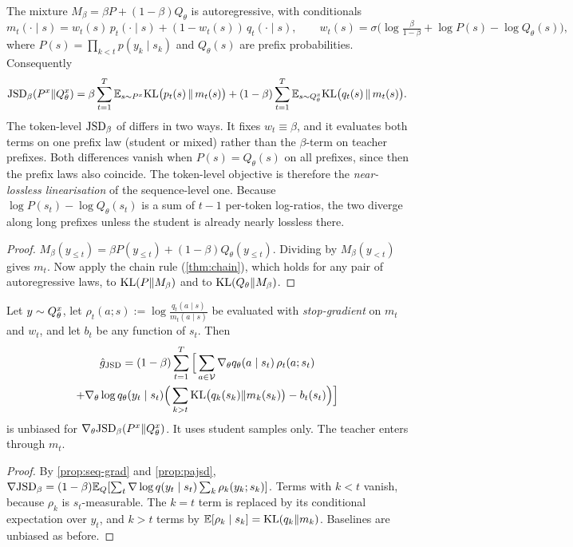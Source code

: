 \begin{proposition}\label{prop:pajsd}
\Pv The mixture $M_\beta=\beta P+(1-\beta)Q_\theta$ is autoregressive, with conditionals
\[
m_t(\cdot\mid s)=w_t(s)\,p_t(\cdot\mid s)+(1-w_t(s))\,q_t(\cdot\mid s),\qquad
w_t(s)=\sigma\Big(\log\tfrac\beta{1-\beta}+\log P(s)-\log Q_\theta(s)\Big),
\]
where $P(s)=\prod_{k<t}p(y_k\mid s_k)$ and $Q_\theta(s)$ are prefix probabilities. Consequently
\[
\mathrm{JSD}_\beta(P^{x}\|Q^{x}_{\theta})=\beta\sum_{t=1}^T\mathbb{E}_{s\sim P^{x}}\mathrm{KL}\big(p_t(s)\,\|\,m_t(s)\big)+(1-\beta)\sum_{t=1}^T\mathbb{E}_{s\sim Q^{x}_{\theta}}\mathrm{KL}\big(q_t(s)\,\|\,m_t(s)\big).
\]
The token-level $\mathrm{JSD}_\beta$ of \citet{agarwal2024gkd} differs in two ways. It fixes $w_t\equiv\beta$, and it
evaluates both terms on one prefix law (student or mixed) rather than the $\beta$-term on teacher
prefixes. Both differences vanish when $P(s)=Q_\theta(s)$ on all prefixes, since then the prefix laws also
coincide. The token-level objective is therefore the \emph{near-lossless linearisation} of the sequence-level
one. Because $\log P(s_t)-\log Q_\theta(s_t)$ is a sum of $t-1$ per-token log-ratios, the two diverge along long
prefixes unless the student is already nearly lossless there.
\end{proposition}
\begin{proof}
$M_\beta(y_{\le t})=\beta P(y_{\le t})+(1-\beta)Q_\theta(y_{\le t})$. Dividing by $M_\beta(y_{<t})$ gives $m_t$. Now
apply the chain rule (\cref{thm:chain}), which holds for any pair of autoregressive laws, to $\mathrm{KL}(P\|M_\beta)$
and to $\mathrm{KL}(Q_\theta\|M_\beta)$.
\end{proof}

\begin{proposition}\label{prop:jsd-est}
\Pv Let $y\sim Q^{x}_{\theta}$, let $\rho_t(a;s):=\log\frac{q_t(a\mid s)}{m_t(a\mid s)}$ be evaluated with \emph{stop-gradient}
on $m_t$ and $w_t$, and let $b_t$ be any function of $s_t$. Then
\begin{multline*}
\hat g_{\mathrm{JSD}}=(1-\beta)\sum_{t=1}^T\Big[\sum_{a\in\mathcal{V}}\nabla_\theta q_\theta(a\mid s_t)\,\rho_t(a;s_t)\\
+\nabla_\theta\log q_\theta(y_t\mid s_t)\Big(\sum_{k>t}\mathrm{KL}\big(q_k(s_k)\|m_k(s_k)\big)-b_t(s_t)\Big)\Big]
\end{multline*}
is unbiased for $\nabla_\theta\mathrm{JSD}_\beta(P^{x}\|Q^{x}_{\theta})$. It uses student samples only. The teacher enters through $m_t$.
\end{proposition}
\begin{proof}
By \cref{prop:seq-grad} and \cref{prop:pajsd},
$\nabla\mathrm{JSD}_\beta=(1-\beta)\mathbb{E}_Q[\sum_t\nabla\log q(y_t\mid s_t)\sum_k\rho_k(y_k;s_k)]$. Terms with $k<t$ vanish, because
$\rho_k$ is $s_t$-measurable. The $k=t$ term is replaced by its conditional expectation over $y_t$, and
$k>t$ terms by $\mathbb{E}[\rho_k\mid s_k]=\mathrm{KL}(q_k\|m_k)$. Baselines are unbiased as before.
\end{proof}

